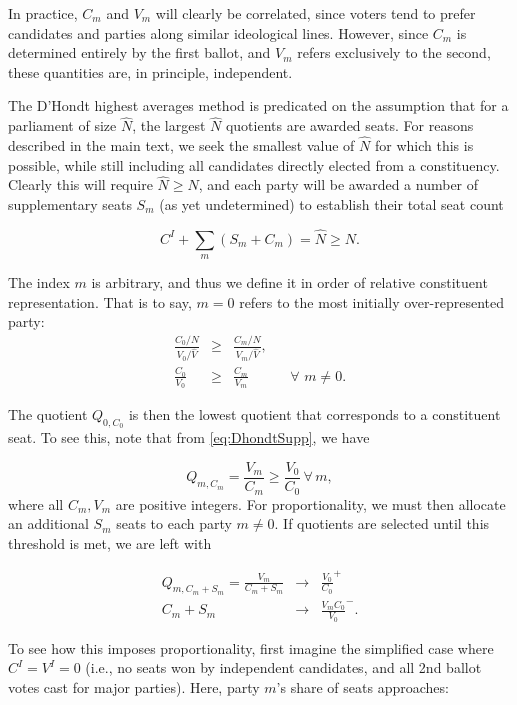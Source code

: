 \documentclass[DIV=calc, paper=a4, fontsize=11pt, twocolumn]{scrartcl}	 %
\begin{document}
In practice, $C_m$ and $V_m$ will clearly be correlated, since voters tend to prefer candidates and parties along similar ideological lines. However, since $C_m$ is determined entirely by the first ballot, and $V_m$ refers exclusively to the second, these quantities are, in principle, independent.

The D'Hondt highest averages method is predicated on the assumption that for a parliament of size $\hat{N}$, the largest $\hat{N}$ quotients are awarded seats. 
For reasons described in the main text, we seek the smallest value of $\hat{N}$ for which this is possible, while still including all candidates directly elected from a constituency.
Clearly this will require $\hat{N}\ge N$, and each party will be awarded a number of supplementary seats $S_m$ (as yet undetermined) to establish their total seat count 

\begin{equation}
\label{eq:sum_Sm}
C^I + \sum_m\left( S_m +C_m\right) = \hat{N} \ge N.
\end{equation}

The index $m$ is arbitrary, and thus we define it in order of relative constituent representation. That is to say, $m=0$ refers to the most initially over-represented party:
\begin{align}
\label{eq:most_overrep}
\frac{C_0/N}{V_0/\hat{V}} &\ge& \frac{C_m/N}{V_m/\hat{V}}, \\
\frac{C_0}{V_0} &\ge& \frac{C_m}{V_m} && \forall \,\, m \neq 0.
\end{align}

The quotient $Q_{0,C_0}$ is then the lowest quotient that corresponds to a constituent seat. To see this, note that from \ref{eq:DhondtSupp}, we have 

\begin{equation}
\label{eq:QmCm}
Q_{m,C_m} = \frac{V_m}{C_m} \ge \frac{V_0}{C_0} \,  \forall \, m,
\end{equation}
where all $C_m,V_m$ are positive integers. For proportionality, we must then allocate an additional $S_m$ seats to each party $m \neq 0$. If quotients are selected until this threshold is met, we are left with

\begin{align}
\label{eq:QmSm}
Q_{m,C_m+S_m} = \frac{V_m}{C_m+S_m} &\to& \frac{V_0}{C_0}^+ \\ 
{C_m+S_m} &\to& \frac{V_mC_0}{V_0}^-.
\end{align}

To see how this imposes proportionality, first imagine the simplified case where $C^I=V^I=0$ (i.e., no seats won by independent candidates, and all 2nd ballot votes cast for major parties). Here, party $m$'s share of seats approaches:
\end{document}
